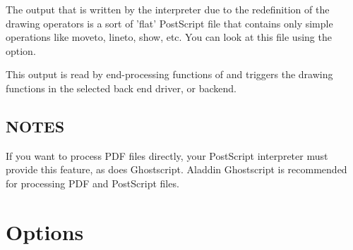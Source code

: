 \documentclass[english,a4paper]{article}
\begin{document}
The output that is written by the interpreter due to the redefinition of the
drawing operators is a sort of 'flat' PostScript file that contains only simple
operations like moveto, lineto, show, etc. You can look at this file using the
 option. 

This output is read by end-processing functions of  and triggers
the drawing functions in the selected back end driver, or backend. 

\subsection{NOTES}

If you want to process PDF files directly, your PostScript interpreter must
provide this feature, as does Ghostscript. Aladdin Ghostscript is
recommended for processing PDF and PostScript files.

\section{Options}
\end{document}

